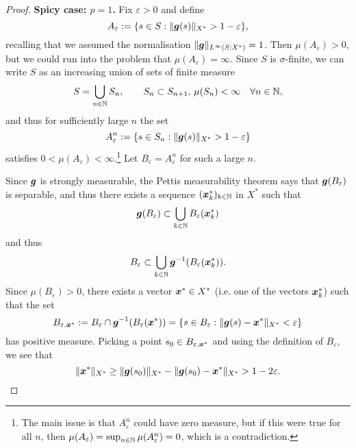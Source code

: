 \begin{proof}
  \textbf{Spicy case: $p=1$.}
  Fix $\varepsilon > 0$ and define
  \begin{equation}
    A_{\varepsilon} := \{s \in S : \|\bm{g}(s)\|_{X^*} > 1-\varepsilon\},
  \end{equation}
  recalling that we assumed the normalisation $\|\bm{g}\|_{L^\infty(S;X^{*})} = 1$.
  Then $\mu(A_\varepsilon) > 0$, but we could run into the problem that $\mu(A_\varepsilon) = \infty$.
  Since $S$ is $\sigma$-finite, we can write $S$ as an increasing union of sets of finite measure
  \begin{equation*}
    S = \bigcup_{n \in \mathbb{N}} S_n, \qquad S_n \subset S_{n+1}, \, \mu(S_n) < \infty \quad \forall n \in \mathbb{N},
  \end{equation*}
  and thus for sufficiently large $n$ the set
  \begin{equation*}
    A_{\varepsilon}^{n} := \{s \in S_n : \|\bm{g}(s)\|_{X^*} > 1 - \varepsilon\}
  \end{equation*}
  satisfies $0 < \mu(A_\varepsilon) < \infty$.\footnote{The main issue is that $A_{\varepsilon}^{n}$ could have zero measure, but if this were true for all $n$, then $\mu(A_{\varepsilon}) = \sup_{n \in \mathbb{N}} \mu(A_{\varepsilon}^n) = 0$, which is a contradiction.}
  Let $B_\varepsilon = A_{\varepsilon}^{n}$ for such a large $n$.

  Since $\bm{g}$ is strongly measurable, the Pettis measurability theorem says that $\bm{g}(B_\varepsilon)$ is separable, and thus there exists a sequence $(\bm{x}^*_{k})_{k \in \mathbb{N}}$ in $X^*$ such that
  \begin{equation*}
    \bm{g}(B_\varepsilon) \subset \bigcup_{k \in \mathbb{N}} B_{\varepsilon}(\bm{x}^{*}_{k})
  \end{equation*}
  and thus
  \begin{equation*}
    B_{\varepsilon} \subset \bigcup_{k \in \mathbb{N}} \bm{g}^{-1}(B_{\varepsilon}(\bm{x}^{*}_{k})).
  \end{equation*}
  Since $\mu(B_{\varepsilon}) > 0$, there exists a vector $\bm{x}^* \in X^*$ (i.e. one of the vectors $\bm{x}_k^{*}$) such that the set
  \begin{equation*}
     B_{\varepsilon, \bm{x}^*} := B_\varepsilon \cap \bm{g}^{-1}(B_{\varepsilon}(\bm{x}^{*})) = \{s \in B_\varepsilon : \|\bm{g}(s) - \bm{x}^{*}\|_{X^*} < \varepsilon\}
  \end{equation*}
  has positive measure.
  Picking a point $s_0 \in B_{\varepsilon, \bm{x}^*}$ and using the definition of $B_{\varepsilon}$, we see that
  \begin{equation*}
    \|\bm{x}^*\|_{X^*} \geq \|\bm{g}(s_0)\|_{X^*} - \|\bm{g}(s_0) - \bm{x}^*\|_{X^*} > 1 - 2\varepsilon.
  \end{equation*}


\end{proof}
